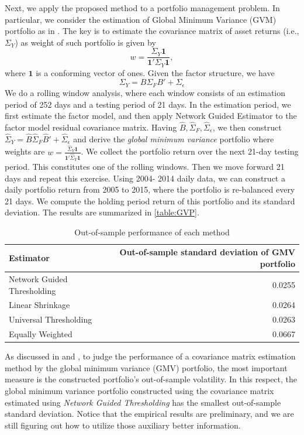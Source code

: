 Next, we apply the proposed method to a portfolio management problem. In particular, we consider the estimation of Global Minimum Variance (GVM) portfolio as in \cite{ledoit2004HoneyShrunk}. The key is to estimate the covariance matrix of asset returns (i.e.,$\Sigma_{Y}$) as weight of such portfolio is given by
\begin{equation*}
    w = \frac{\Sigma_{Y} \mathbf{1}}{\mathbf{1}' \Sigma_{Y} \mathbf{1}},
\end{equation*}
where \(\mathbf{1}\) is a conforming vector of ones. Given the factor structure,  we have
\begin{equation*}
    \Sigma_{Y} = B \Sigma_{F} B' + \Sigma_{\epsilon}
\end{equation*}
We do a rolling window analysis, where each window consists of an estimation period of 252 days and a testing period of 21 days. In the estimation period, we first estimate the factor model, and then apply Network Guided Estimator to the factor model residual covariance matrix. Having \(\hat{B} ,\hat{\Sigma}_{F}, \hat{\Sigma}_{\epsilon}\), we then construct $\hat{\Sigma}_{Y} = \hat{B} \hat{\Sigma}_{F} \hat{B}' + \hat{\Sigma}_{\epsilon}$ and derive the \textit{global minimum variance} portfolio where weights are $w = \frac{\hat{\Sigma}_{Y} \mathbf{1}}{\mathbf{1}' \hat{\Sigma}_{Y} \mathbf{1}}$.  We collect the portfolio return over the next 21-day testing period. This constitutes one of the rolling windows. Then we move forward 21 days and repeat this exercise. Using 2004- 2014 daily data, we can construct a daily portfolio return from 2005 to 2015, where the portfolio is re-balanced every 21 days. We compute the holding period return of this portfolio and its standard deviation. The results are summarized in \autoref{table:GVP}. 
\begin{table}[H]
    \centering
    \begin{tabular}{lr}
\toprule
Estimator &  Out-of-sample standard deviation of GMV portfolio              \\
\midrule
Network Guided Thresholding      &              0.0255  \\
Linear Shrinkage       &               0.0264\\
Universal Thresholding &                0.0263  \\
Equally Weighted        &        0.0667\\
\bottomrule
\end{tabular}
    \caption{Out-of-sample performance of each method}
    \label{table:GVP}
\end{table}
As discussed in \cite{engle2019large} and \cite{chen2019new}, 
to judge the performance of a covariance matrix estimation method by the global minimum variance (GMV) portfolio, the most important measure is the constructed portfolio's out-of-sample volatility. In this respect, the global minimum variance portfolio constructed using the covariance matrix estimated using \textit{Network Guided Thresholding} has the smallest out-of-sample standard deviation.  Notice that the empirical results are preliminary, and we are still figuring out how to utilize those auxiliary better information. 
